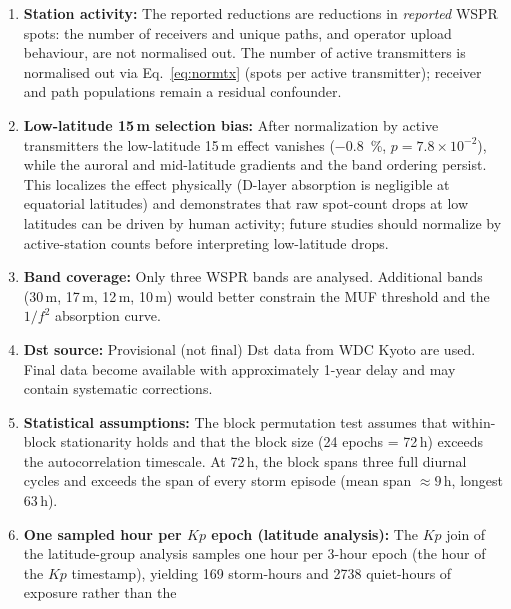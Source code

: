 \documentclass{agujournal2019}
\begin{document}
\begin{enumerate}
	      1--3\,pp.
	      Summer 15\,m observations may be partially contaminated by
	      sporadic-E propagation \citep{whitehead1989}; however, the storm effect is present in all
	      seasons, including winter when Es is absent. No corresponding F10.7 analysis was performed for the held-out period, as only a single monthly data point (January 2026) is available.
	\item \textbf{Station activity:} The reported reductions are reductions
	      in \emph{reported} WSPR spots: the number of receivers and unique
	      paths, and operator upload behaviour, are not normalised out. The
	      number of active transmitters is normalised out via
	      Eq.~\eqref{eq:normtx} (spots per active transmitter); receiver
	      and path populations remain a residual confounder.
	\item \textbf{Low-latitude 15\,m selection bias:} After normalization
	      by active transmitters the low-latitude 15\,m effect vanishes
	      (\SI{-0.8}{\percent}, $p = 7.8 \times 10^{-2}$), while
	      the auroral and mid-latitude gradients and the band ordering
	      persist. This localizes the effect physically (D-layer
	      absorption is negligible at equatorial latitudes) and
	      demonstrates that raw spot-count drops at low latitudes can be
	      driven by human activity; future studies should normalize by
	      active-station counts before interpreting low-latitude drops.
	\item \textbf{Band coverage:} Only three WSPR bands are analysed. Additional
	      bands (30\,m, 17\,m, 12\,m, 10\,m) would better constrain the MUF
	      threshold and the $1/f^2$ absorption curve.
	\item \textbf{Dst source:} Provisional (not final) Dst data from WDC Kyoto
	      are used. Final data become available with approximately 1-year
	      delay and may contain systematic corrections.
	\item \textbf{Statistical assumptions:} The block permutation test assumes
	      that within-block stationarity holds and that the block size
	      (24 epochs = 72\,h) exceeds the autocorrelation timescale. At
	      72\,h, the block spans three full diurnal cycles and exceeds
	      the span of every storm episode (mean span $\approx 9$\,h,
	      longest 63\,h).
	\item \textbf{One sampled hour per $Kp$ epoch (latitude analysis):}
	      The $Kp$ join of the latitude-group analysis samples one hour
	      per 3-hour epoch (the hour of the $Kp$ timestamp), yielding 169
	      storm-hours and 2738 quiet-hours of exposure rather than the

\end{enumerate}
\end{document}
